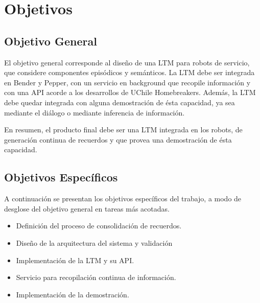 


\section{Objetivos}

\subsection{Objetivo General}

El objetivo general corresponde al dise\~no de una LTM para robots de servicio, que considere componentes epis\'odicos y sem\'anticos. La LTM debe ser integrada en Bender y Pepper, con un servicio en background que recopile informaci\'on y con una API acorde a los desarrollos de UChile Homebreakers. Adem\'as, la LTM debe quedar integrada con alguna demostraci\'on de \'esta capacidad, ya sea mediante el di\'alogo o mediante inferencia de informaci\'on.

En resumen, el producto final debe ser una LTM integrada en los robots, de generaci\'on continua de recuerdos y que provea una demostraci\'on de \'esta capacidad.


\subsection{Objetivos Espec\'ificos}

A continuaci\'on se presentan los objetivos espec\'ificos del trabajo, a modo de desglose del objetivo general en tareas m\'as acotadas.

\begin{itemize}
\item Definici\'on del proceso de consolidaci\'on de recuerdos.
\item Dise\~no de la arquitectura del sistema y validaci\'on
\item Implementaci\'on de la LTM y su API.
\item Servicio para recopilaci\'on continua de informaci\'on.
\item Implementaci\'on de la demostraci\'on.
\end{itemize}

